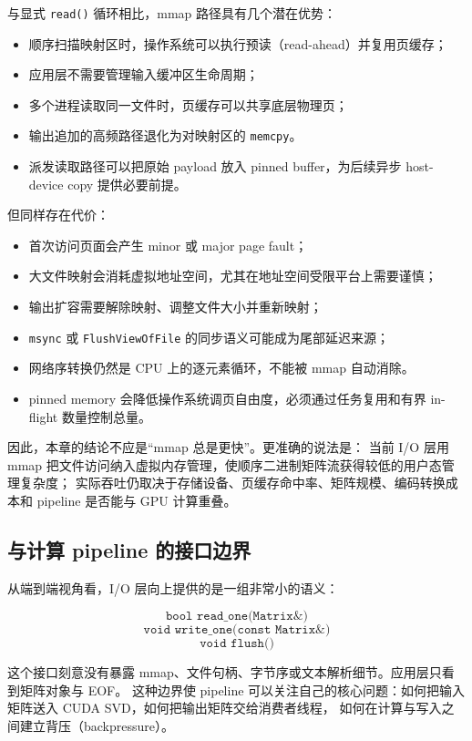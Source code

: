 与显式 \texttt{read()} 循环相比，mmap 路径具有几个潜在优势：

\begin{itemize}
    \item 顺序扫描映射区时，操作系统可以执行预读（read-ahead）并复用页缓存；
    \item 应用层不需要管理输入缓冲区生命周期；
    \item 多个进程读取同一文件时，页缓存可以共享底层物理页；
    \item 输出追加的高频路径退化为对映射区的 \texttt{memcpy}。
    \item 派发读取路径可以把原始 payload 放入 pinned buffer，为后续异步 host-device copy 提供必要前提。
\end{itemize}

但同样存在代价：

\begin{itemize}
    \item 首次访问页面会产生 minor 或 major page fault；
    \item 大文件映射会消耗虚拟地址空间，尤其在地址空间受限平台上需要谨慎；
    \item 输出扩容需要解除映射、调整文件大小并重新映射；
    \item \texttt{msync} 或 \texttt{FlushViewOfFile} 的同步语义可能成为尾部延迟来源；
    \item 网络序转换仍然是 CPU 上的逐元素循环，不能被 mmap 自动消除。
    \item pinned memory 会降低操作系统调页自由度，必须通过任务复用和有界 in-flight 数量控制总量。
\end{itemize}

因此，本章的结论不应是“mmap 总是更快”。更准确的说法是：
当前 I/O 层用 mmap 把文件访问纳入虚拟内存管理，使顺序二进制矩阵流获得较低的用户态管理复杂度；
实际吞吐仍取决于存储设备、页缓存命中率、矩阵规模、编码转换成本和 pipeline 是否能与 GPU 计算重叠。

\subsection{与计算 pipeline 的接口边界}

从端到端视角看，I/O 层向上提供的是一组非常小的语义：

\[
    \texttt{bool read\_one(Matrix\&)}
\]
\[
    \texttt{void write\_one(const Matrix\&)}
\]
\[
    \texttt{void flush()}
\]

这个接口刻意没有暴露 mmap、文件句柄、字节序或文本解析细节。应用层只看到矩阵对象与 EOF。
这种边界使 pipeline 可以关注自己的核心问题：如何把输入矩阵送入 CUDA SVD，如何把输出矩阵交给消费者线程，
如何在计算与写入之间建立背压（backpressure）。

